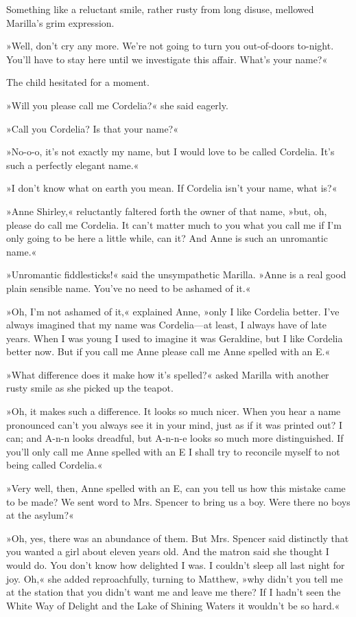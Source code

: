 Something like a reluctant smile, rather rusty from long disuse, mellowed Marilla's grim expression.

»Well, don't cry any more. We're not going to turn you out-of-doors to-night. You'll have to stay here until we investigate this affair. What's your name?«

The child hesitated for a moment.

»Will you please call me Cordelia?« she said eagerly.

»Call you Cordelia? Is that your name?«

»No-o-o, it's not exactly my name, but I would love to be called Cordelia. It's such a perfectly elegant name.«

»I don't know what on earth you mean. If Cordelia isn't your name, what is?«

»Anne Shirley,« reluctantly faltered forth the owner of that name, »but, oh, please do call me Cordelia. It can't matter much to you what you call me if I'm only going to be here a little while, can it? And Anne is such an unromantic name.«

»Unromantic fiddlesticks!« said the unsympathetic Marilla. »Anne is a real good plain sensible name. You've no need to be ashamed of it.«

»Oh, I'm not ashamed of it,« explained Anne, »only I like Cordelia better. I've always imagined that my name was Cordelia—at least, I always have of late years. When I was young I used to imagine it was Geraldine, but I like Cordelia better now. But if you call me Anne please call me Anne spelled with an E.«

»What difference does it make how it's spelled?« asked Marilla with another rusty smile as she picked up the teapot.

»Oh, it makes such a difference. It looks so much nicer. When you hear a name pronounced can't you always see it in your mind, just as if it was printed out? I can; and A-n-n looks dreadful, but A-n-n-e looks so much more distinguished. If you'll only call me Anne spelled with an E I shall try to reconcile myself to not being called Cordelia.«

»Very well, then, Anne spelled with an E, can you tell us how this mistake came to be made? We sent word to Mrs. Spencer to bring us a boy. Were there no boys at the asylum?«

»Oh, yes, there was an abundance of them. But Mrs. Spencer said distinctly that you wanted a girl about eleven years old. And the matron said she thought I would do. You don't know how delighted I was. I couldn't sleep all last night for joy. Oh,« she added reproachfully, turning to Matthew, »why didn't you tell me at the station that you didn't want me and leave me there? If I hadn't seen the White Way of Delight and the Lake of Shining Waters it wouldn't be so hard.«

